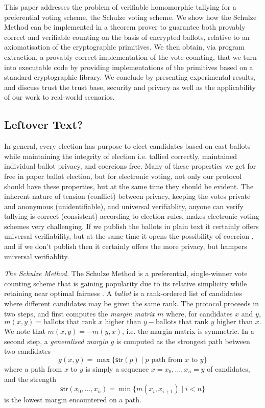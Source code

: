 \documentclass{llncs}
\newcommand{\str}{\mathsf{str}}
\begin{document}
This paper addresses the problem of verifiable homomorphic tallying
for a preferential voting scheme, the Schulze voting scheme. We show
how the Schulze Method can be implemented in a theorem prover to
guarantee both provably correct and verifiable counting on the basis
of encrypted ballots, relative to an axiomatisation of the
cryptographic primitives. We then obtain, via program extraction, a
provably correct implementation of the vote counting, that we turn
into executable code by providing implementations of the primitives
based on a standard cryptographic library. We conclude by presenting
experimental results, and discuss trust the trust base, security and
privacy as well as the applicability of our work to real-world
scenarios. 

\subsection*{Leftover Text?}
In general, every election has purpose to elect candidates based on cast
  ballots while maintaining the integrity of election i.e. tallied correctly, 
  maintained individual ballot privacy, and coercions free. Many of these properties 
  we get for free in paper ballot election, but for electronic voting, not only 
  our protocol should have these properties, but at the same time they should be 
  evident. The inherent nature of tension (conflict) between privacy, keeping the votes 
  private and anonymous (unidentifiable), and universal verifiablity, anyone can verify
  tallying is correct (consistent) according to election rules, makes electronic 
  voting schemes very challenging. If we publish 
  the ballots in plain text it certainly offers universal verifiability, but at the same
  time it opens the possibility of coercion \cite{Benaloh:2009:SSC}, and if we don't
  publish then it certainly offers the more privacy, but hampers universal 
  verifiablity. \linebreak
      
  \smallskip\noindent\emph{The Schulze Method.} The Schulze Method
  \cite{Schulze:2011:NMC} is a preferential, single-winner vote
  counting scheme that is gaining popularity due to its relative
  simplicity while retaining near optimal fairness
  \cite{Rivest:2010:OSW}.  
  A \emph{ballot} is a rank-ordered list of
  candidates where different candidates may be given the same rank.
  The protocol proceeds in two steps, and first computes the
  \emph{margin matrix} $m$ where, for candidates $x$ and $y$, 
  \[ m(x, y) = \mbox{ballots that rank $x$ higher than $y$} - \mbox{ballots
  that rank $y$ higher than $x$}. \]
  We note that $m(x, y) = -m(y, x)$, i.e. the margin matrix is
  symmetric. In a second step, a \emph{generalised margin} $g$ is
  computed as the strongest path between two candidates
  \[ g(x,y) = \max \lbrace \str(p) \mid p \mbox{ path from $x$ to
  $y$} \rbrace \]
  where a path from $x$ to $y$ is simply a sequence $x = x_0, \dots,
  x_n = y$ of candidates, and the strength
  \[ \str(x_0, \dots, x_n) = \min \lbrace m(x_i, x_{i+1}) \mid i < n
  \rbrace  \]
  is the lowest margin encountered on a path.
\end{document}
